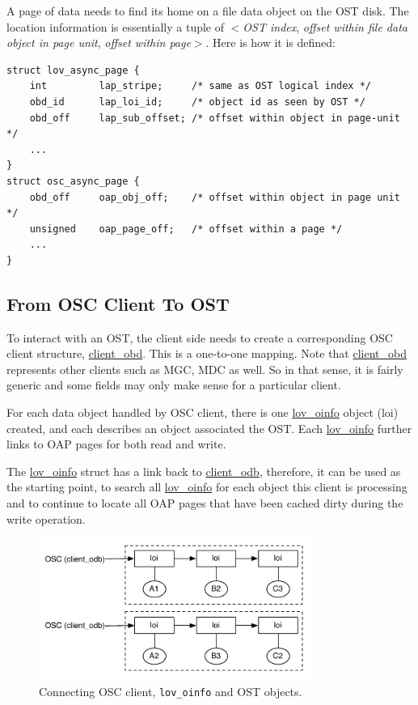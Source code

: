  
A page of data needs to find its home on a file data object on
the OST disk. The location information is essentially a tuple of
     $<$\textit{OST index},
     \textit{offset within file data object in page unit},
     \textit{offset within page}$>$.
Here is how it is defined:

\begin{Verbatim}
struct lov_async_page {
    int         lap_stripe;     /* same as OST logical index */
    obd_id      lap_loi_id;     /* object id as seen by OST */
    obd_off     lap_sub_offset; /* offset within object in page-unit */
    ...
}
struct osc_async_page {
    obd_off     oap_obj_off;    /* offset within object in page unit */
    unsigned    oap_page_off;   /* offset within a page */
    ...
}
\end{Verbatim}

\subsection{From OSC Client To OST}

To interact with an OST, the client side needs to create a corresponding OSC client
structure, \url{client_obd}. This is a one-to-one mapping.  Note that
\url{client_obd} represents other clients such as MGC, MDC as well. So in that
sense, it is fairly generic and some fields may only make sense for a
particular client.

For each data object handled by OSC client, there is one \url{lov_oinfo}
object (loi) created, and each describes an object associated the OST. Each
\url{lov_oinfo} further links to OAP pages for both read and write.

The \url{lov_oinfo} struct has a link back to \url{client_odb}, therefore, it
can be used as the starting point, to search all \url{lov_oinfo} for each
object this client is processing and to continue to locate all OAP pages
that have been cached dirty during the write operation.

\begin{figure}[htb]
\centering
\includegraphics[width=3.5in]{img/client_loi}
\caption{Connecting OSC client, \texttt{lov\_oinfo} and OST objects.}
\label{fig:client_loi}
\end{figure}

